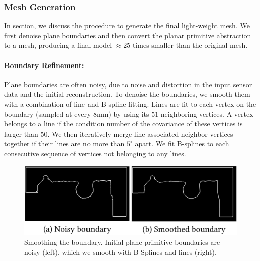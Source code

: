 \subsubsection{Mesh Generation}
\label{sec:approach-mesh}
In section, we discuss the procedure to generate the final light-weight mesh. 
We first denoise plane boundaries and then convert the planar primitive abstraction to a mesh, producing a final model $\approx 25$ times smaller than the original mesh.

\paragraph*{Boundary Refinement:}
Plane boundaries are often noisy, due to noise and distortion in the input sensor data and the initial reconstruction.
To denoise the boundaries, we smooth them with a combination of line and B-spline fitting.
Lines are fit to each vertex on the boundary (sampled at every 8mm) by using its $51$ neighboring vertices. 
A vertex belongs to a line if the condition number of the covariance of these vertices is larger than 50.
We then iteratively merge line-associated neighbor vertices together if their lines are no more than $5^\circ$ apart.
We fit B-splines to each consecutive sequence of vertices not belonging to any lines.

\begin{figure}
\centering
\includegraphics[width=0.75\linewidth]{3dlite/fig11.png}
\caption{Smoothing the boundary. Initial plane primitive boundaries are noisy (left), which we smooth with B-Splines and lines (right).}
\label{fig:boundary-fit}
\end{figure}

